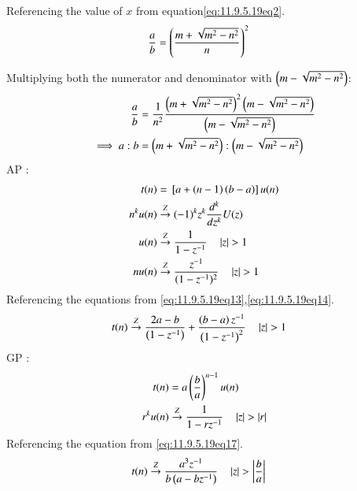 \documentclass[journal,12pt,onecolumn]{IEEEtran}
\newcommand{\system}[1]{\stackrel{#1}{\rightarrow}}
\theoremstyle{remark}
\begin{document}
Referencing the value of $x$ from equation\eqref{eq:11.9.5.19eq2}.
\begin{align}
\frac{a}{b} &=\left(\frac{m + \sqrt{m^2 - n^2}}{n}\right)^2  \label{eq:11.9.5.19eq8}
\end{align}

Multiplying both the numerator and denominator with $\left(m-\sqrt{m^2 - n^2}\right)$: 
\begin{align} 
\frac{a}{b} &= \frac{1}{n^2} \frac{\left(m + \sqrt{m^2 - n^2}\right)^2  \left(m-\sqrt{m^2 - n^2}\right)}{\left(m-\sqrt{m^2 - n^2}\right)}\label{eq:11.9.5.19eq9}\\
\implies a:b &= \left( m + \sqrt{m^2 - n^2}\right): \left(m - \sqrt{m^2 - n^2}\right)\label{eq:11.9.5.19eq10}
\end{align}
AP :
\begin{align}
t(n)&=\sbrak{a+\brak{n-1}\brak{b-a}}u(n)\label{eq:11.9.5.19eq11}\\
n^k u(n) &\system{Z} (-1)^k z^k \frac{d^k}{dz^k}U(z)\label{eq:11.9.5.19eq12}\\
u(n) &\system{Z} \frac{1}{1 - z^{-1}} \quad \abs{ z} > 1 \label{eq:11.9.5.19eq13}\\
nu(n) &\system{Z} \frac{z^{-1}}{(1 - z^{-1})^2} \quad \abs{ z} > 1 \label{eq:11.9.5.19eq14}
\end{align}
Referencing the equations from \eqref{eq:11.9.5.19eq13},\eqref{eq:11.9.5.19eq14}.\\
\begin{align}
t(n) &\system{Z} \frac{2a-b}{\brak{1 - z^{-1}}}+\frac{\brak{b-a}z^{-1}}{\brak{1-z^{-1}}^2} \quad \abs{ z} > 1  \label{eq:11.9.5.19eq15}
\end{align}
GP :
\begin{align}
t(n)&=a\brak{{\frac{b}{a}}}^{n-1}u(n)\label{eq:11.9.5.19eq16}\\
r^k u(n) &\system{Z} \frac{1}{1-rz^{-1}} \quad \abs{ z} > \abs{r} \label{eq:11.9.5.19eq17}
\end{align}
Referencing the equation from \eqref{eq:11.9.5.19eq17}.\\
\begin{align}
t(n) &\system{Z} \frac{a^3 z^{-1}}{b\brak{a-bz^{-1}}} \quad \abs{ z} > \abs{\frac{b}{a}}\label{eq:11.9.5.19eq18}
\end{align}
\end{document}
